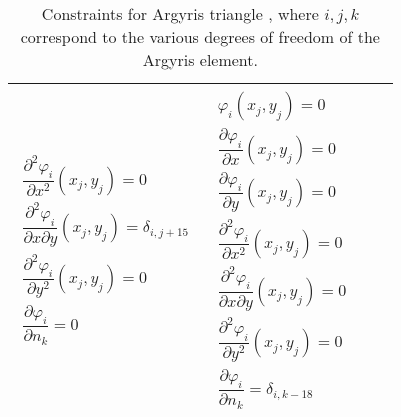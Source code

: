 \begin{sidewaystable}
\begin{center}
{\begin{tabular}{|p{2in}|p{2in}|p{2in}|p{2in}|}
\begin{equation*}
\begin{split}
		\dfrac{\partial^2 \varphi_i}{\partial x^2} (x_j,y_j) = 0 \\
		\dfrac{\partial^2 \varphi_i}{\partial x \partial y} (x_j,y_j) = \delta_{i,j+15} \\
		\dfrac{\partial^2 \varphi_i}{\partial y^2} (x_j,y_j) = 0 \\
		\dfrac{\partial\varphi_i}{\partial n_k} = 0
		\end{split}
	\end{equation*}
	& \begin{equation*}
		\begin{split}
		\varphi_i (x_j,y_j) = 0 \\
		\dfrac{\partial \varphi_i}{\partial x} (x_j,y_j) = 0 \\
		\dfrac{\partial \varphi_i}{\partial y} (x_j,y_j) = 0 \\
		\dfrac{\partial^2 \varphi_i}{\partial x^2} (x_j,y_j) = 0 \\
		\dfrac{\partial^2 \varphi_i}{\partial x \partial y} (x_j,y_j) = 0 \\
		\dfrac{\partial^2 \varphi_i}{\partial y^2} (x_j,y_j) = 0 \\
		\dfrac{\partial\varphi_i}{\partial n_k} = \delta_{i,k-18}
		\end{split}
	\end{equation*} & \\
	\hline
\end{tabular}}
\caption{Constraints for Argyris triangle
  \cite{Argyris,Brenner,Ciarlet,Dominguez08}, where $i,j,k$ correspond to the
  various degrees of freedom of the Argyris element.}
\label{tab:Constraints}
\end{center}
\end{sidewaystable}
